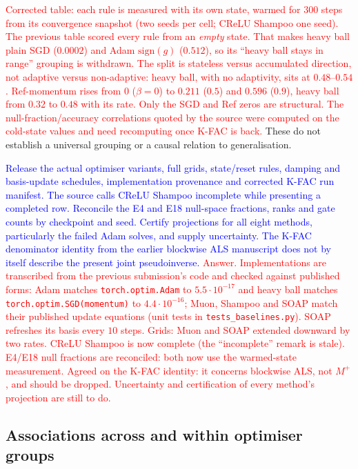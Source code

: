 \documentclass{article}
\newcommand{\zied}[1]{\textcolor{blue}{#1}}
\newcommand{\nat}[1]{\textcolor{red}{#1}}
\theoremstyle{definition}
\theoremstyle{remark}
\begin{document}
\nat{Corrected table: each rule is measured with its own state, warmed for $300$ steps from its convergence snapshot (two seeds per cell; CReLU Shampoo one seed). The previous table scored every rule from an \emph{empty} state. That makes heavy ball plain SGD ($0.0002$) and Adam $\mathrm{sign}(g)$ ($0.512$), so its ``heavy ball stays in range'' grouping is withdrawn. The split is stateless versus accumulated direction, not adaptive versus non-adaptive: heavy ball, with no adaptivity, sits at $0.48$--$0.54$. Ref-momentum rises from $0$ ($\beta=0$) to $0.211$ ($0.5$) and $0.596$ ($0.9$), heavy ball from $0.32$ to $0.48$ with its rate. Only the SGD and Ref zeros are structural. The null-fraction/accuracy correlations quoted by the source were computed on the cold-state values and need recomputing once K-FAC is back.} These do not establish a universal grouping or a causal relation to generalisation.

\zied{Release the actual optimiser variants, full grids, state/reset rules, damping and basis-update schedules, implementation provenance and corrected K-FAC run manifest. The source calls CReLU Shampoo incomplete while presenting a completed row. Reconcile the E4 and E18 null-space fractions, ranks and gate counts by checkpoint and seed. Certify projections for all eight methods, particularly the failed Adam solves, and supply uncertainty. The K-FAC denominator identity from the earlier blockwise ALS manuscript does not by itself describe the present joint pseudoinverse.}
\nat{Answer. Implementations are transcribed from the previous submission's code and checked against published forms: Adam matches \texttt{torch.optim.Adam} to $5.5\cdot10^{-17}$ and heavy ball matches \texttt{torch.optim.SGD(momentum)} to $4.4\cdot10^{-16}$; Muon, Shampoo and SOAP match their published update equations (unit tests in \texttt{tests\_baselines.py}). SOAP refreshes its basis every $10$ steps. Grids: Muon and SOAP extended downward by two rates. CReLU Shampoo is now complete (the ``incomplete'' remark is stale). E4/E18 null fractions are reconciled: both now use the warmed-state measurement. Agreed on the K-FAC identity: it concerns blockwise ALS, not $M^+$, and should be dropped. Uncertainty and certification of every method's projection are still to do.}

\subsection{Associations across and within optimiser groups}\label{app:e18b}
\end{document}

